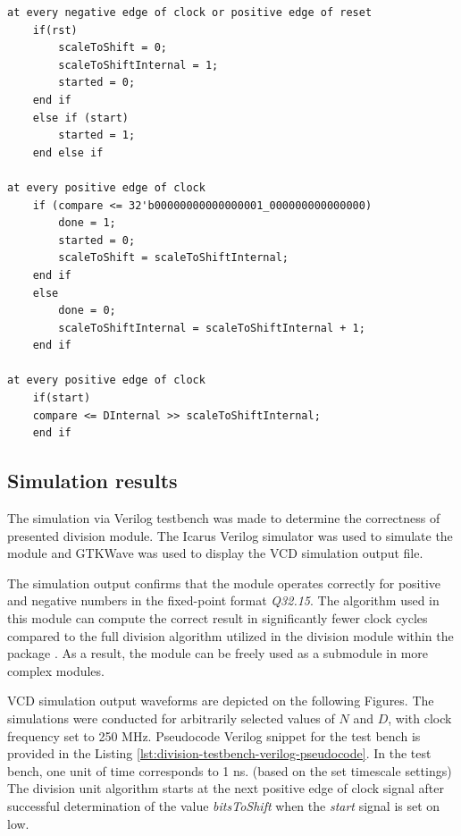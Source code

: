 \documentclass[a4paper, twoside, 11pt]{article}
\begin{document}

\begin{lstlisting}[language={pseudocode}, caption={Pseudocode for the denominatorSizeScaleUnit module algorithm.}, label= {lst:denominatorSizeScaleUnit-pseudocode}]
at every negative edge of clock or positive edge of reset
    if(rst)
        scaleToShift = 0;
        scaleToShiftInternal = 1;
        started = 0;
    end if
    else if (start)
        started = 1;
    end else if

at every positive edge of clock
    if (compare <= 32'b00000000000000001_000000000000000)
        done = 1;
        started = 0;
        scaleToShift = scaleToShiftInternal;
    end if
    else
        done = 0;
        scaleToShiftInternal = scaleToShiftInternal + 1;
    end if

at every positive edge of clock
    if(start)
    compare <= DInternal >> scaleToShiftInternal;
    end if
\end{lstlisting}

\subsection{Simulation results}
The simulation via Verilog testbench was made to determine the correctness of presented division module. The Icarus Verilog simulator was used to simulate the module and GTKWave was used to display the VCD simulation output file.\par
The simulation output confirms that the module operates correctly for positive and negative numbers in the fixed-point format \textit{Q32.15}. The algorithm used in this module can compute the correct result in significantly fewer clock cycles compared to the full division algorithm utilized in the division module within the package \cite{burke-fixed-point-math-library}. As a result, the module can be freely used as a submodule in more complex modules.\par
VCD simulation output waveforms are depicted on the following Figures. The simulations were conducted for arbitrarily selected values of $N$ and $D$, with clock frequency set to 250 MHz. Pseudocode Verilog snippet for the test bench is provided in the Listing \ref{lst:division-testbench-verilog-pseudocode}. In the test bench, one unit of time corresponds to 1 ns. (based on the set timescale settings) The division unit algorithm starts at the next positive edge of clock signal after successful determination of the value \textit{bitsToShift} when the \textit{start} signal is set on low.
\end{document}
